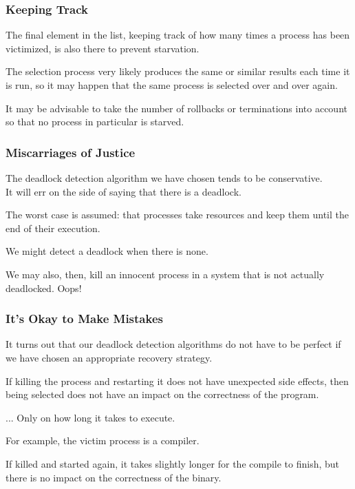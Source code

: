 \begin{frame}
	\frametitle{Keeping Track}

	The final element in the list, keeping track of how many times a process has been victimized, is also there to prevent starvation.

	The selection process very likely produces the same or similar results each time it is run, so it may happen that the same process is selected over and over again.

	It may be advisable to take the number of rollbacks or terminations into account so that no process in particular is starved.

\end{frame}

\begin{frame}
	\frametitle{Miscarriages of Justice}

	The deadlock detection algorithm we have chosen tends to be conservative.\\
	\quad It will err on the side of saying that there is a deadlock.

	The worst case is assumed: that processes take resources and keep them until the end of their execution.

	We might detect a deadlock when there is none.

	We may also, then, kill an innocent process in a system that is not actually deadlocked. Oops!

\end{frame}

\begin{frame}
	\frametitle{It's Okay to Make Mistakes}

	It turns out that our deadlock detection algorithms do not have to be perfect if we have chosen an appropriate recovery strategy.

	If killing the process and restarting it does not have unexpected side effects, then being selected does not have an impact on the correctness of the program.

	... Only on how long it takes to execute.

	For example, the victim process is a compiler.

	If killed and started again, it takes slightly longer for the compile to finish, but there is no impact on the correctness of the binary.


\end{frame}



